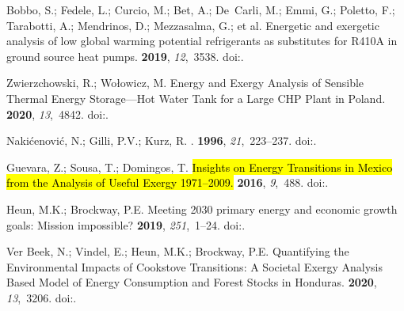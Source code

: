 \documentclass[energies,article,accept,moreauthors,pdftex]{Definitions/mdpi}\usepackage[]{graphicx}\usepackage[]{color}
\begin{document}
\begin{thebibliography}{999}
Bobbo, S.; Fedele, L.; Curcio, M.; Bet, A.; De~Carli, M.; Emmi, G.; Poletto,
  F.; Tarabotti, A.; Mendrinos, D.; Mezzasalma, G.; et al.
\newblock Energetic and exergetic analysis of low global warming potential
  refrigerants as substitutes for {R410A} in ground source heat pumps.
 {\bf 2019}, {\em 12},~3538.
\newblock
  doi:{\href{https://doi.org/10.3390/en12183538}{}}.%

Zwierzchowski, R.; Wo{\l}owicz, M.
\newblock Energy and Exergy Analysis of Sensible Thermal Energy Storage---Hot
  Water Tank for a Large {CHP} Plant in {P}oland.
 {\bf 2020}, {\em 13},~4842.
\newblock
  doi:{\href{https://doi.org/10.3390/en13184842}{}}.%

Naki{\'{c}}enovi{\'{c}}, N.; Gilli, P.V.; Kurz, R.
.
 {\bf 1996}, {\em 21},~223--237.
\newblock
  doi:{\href{https://doi.org/10.1016/0360-5442(96)00001-1}{}}.%

Guevara, Z.; Sousa, T.; Domingos, T.
\newblock\hl{ Insights on Energy Transitions in {M}exico from the Analysis of
  Useful Exergy 1971--2009.}
 {\bf 2016}, {\em 9},~488.
\newblock
  doi:{\href{https://doi.org/10.3390/en9070488}{}}.%

Heun, M.K.; Brockway, P.E.
\newblock Meeting 2030 primary energy and economic growth goals: Mission
  impossible?
 {\bf 2019}, {\em 251},~1--24.
\newblock
  doi:{\href{https://doi.org/10.1016/j.apenergy.2019.01.255}{}}.%

{Ver Beek}, N.; Vindel, E.; Heun, M.K.; Brockway, P.E.
\newblock Quantifying the Environmental Impacts of Cookstove Transitions: A
  Societal Exergy Analysis Based Model of Energy Consumption and Forest Stocks
  in {H}onduras.
 {\bf 2020}, {\em 13},~3206.
\newblock
  doi:{\href{https://doi.org/10.3390/en13123206}{}}.%


\end{thebibliography}
\end{document}
